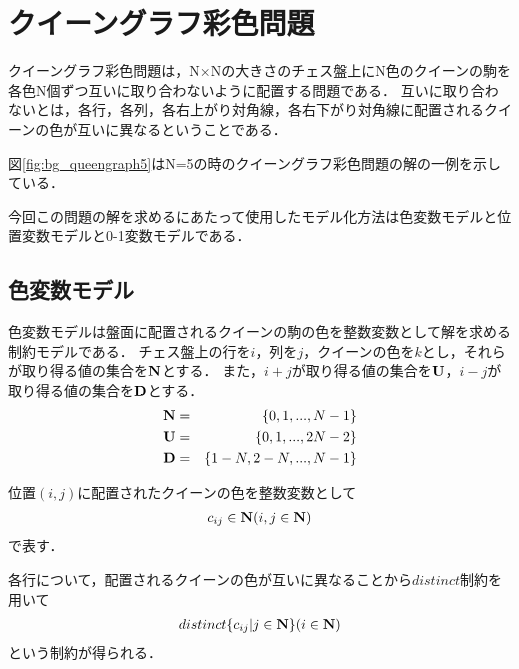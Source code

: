\chapter{クイーングラフ彩色問題}\label{sec:bg}

クイーングラフ彩色問題は，N×Nの大きさのチェス盤上にN色のクイーンの駒を各色N個ずつ互いに取り合わないように配置する問題である．
互いに取り合わないとは，各行，各列，各右上がり対角線，各右下がり対角線に配置されるクイーンの色が互いに異なるということである．

\label{fig:bg_queengraph5}

図\ref{fig:bg_queengraph5}はN=5の時のクイーングラフ彩色問題の解の一例を示している．

今回この問題の解を求めるにあたって使用したモデル化方法は色変数モデルと位置変数モデルと0-1変数モデルである．


\section{色変数モデル}\label{sec:bg_col}
色変数モデルは盤面に配置されるクイーンの駒の色を整数変数として解を求める制約モデルである．
チェス盤上の行を$i$，列を$j$，クイーンの色を$k$とし，それらが取り得る値の集合を$\bf N$とする．
また，$i+j$が取り得る値の集合を$\bf U$，$i-j$が取り得る値の集合を$\bf D$とする．
\begin{eqnarray}
    {\bf N} & = &\{0,1,...,N-1\} \nonumber \\
    {\bf U} & = &\{0,1,...,2N-2\} \nonumber \\
    {\bf D} & = &\{1-N,2-N,...,N-1\} \nonumber
\end{eqnarray}

位置$(i,j)$に配置されたクイーンの色を整数変数として
\begin{eqnarray}
    c_{ij} \in {\bf N} (i,j \in {\bf N}) \label{eq:bg_col_1}
\end{eqnarray}
で表す．

各行について，配置されるクイーンの色が互いに異なることから$distinct$制約を用いて
\begin{eqnarray}
    distinct\{c_{ij} | j \in {\bf N} \} (i \in {\bf N}) \label{eq:bg_col_2}
\end{eqnarray}
という制約が得られる．

